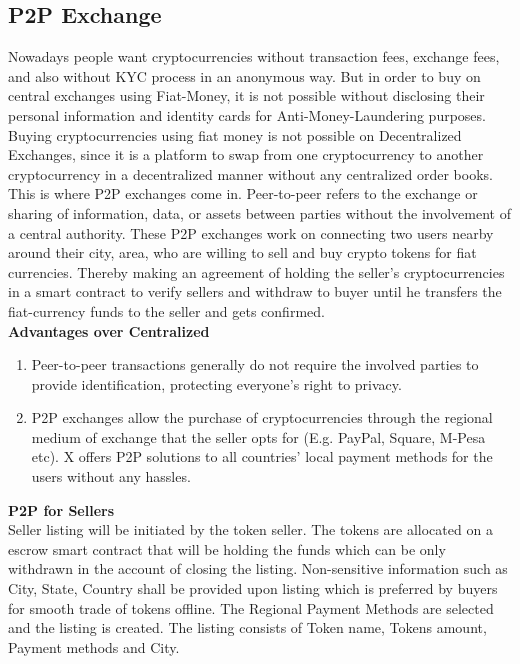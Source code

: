 \documentclass[letterpaper,11pt]{article}
\begin{document}
\subsection{P2P Exchange}

Nowadays people want cryptocurrencies without transaction fees, exchange fees, and also without KYC process in an anonymous way. But in order to buy on central exchanges using Fiat-Money, it is not possible without disclosing their personal information and identity cards for Anti-Money-Laundering purposes. Buying cryptocurrencies using fiat money is not possible on Decentralized Exchanges, since it is a platform to swap from one cryptocurrency to another cryptocurrency in a decentralized manner without any centralized order books.\\

This is where P2P exchanges come in. Peer-to-peer refers to the exchange or sharing of information, data, or assets between parties without the involvement of a central authority. These P2P exchanges work on connecting two users nearby around their city, area, who are willing to sell and buy crypto tokens for fiat currencies. Thereby making an agreement of holding the seller's cryptocurrencies in a smart contract to verify sellers and withdraw to buyer until he transfers the fiat-currency funds to the seller and gets confirmed.\\

\textbf{Advantages over Centralized}

\begin{enumerate}[wide, labelwidth=!, labelindent=0pt]
\item Peer-to-peer transactions generally do not require the involved parties to provide identification,  protecting everyone's right to privacy. 
\item P2P exchanges allow the purchase of cryptocurrencies through the regional medium of exchange that the seller opts for (E.g. PayPal, Square, M-Pesa  etc). X offers P2P solutions to all countries' local payment methods for the users without any hassles.
\end{enumerate}

\textbf{P2P for Sellers}\\

Seller listing will be initiated by the token seller. The tokens are allocated on a escrow smart contract that will be holding the funds which can be only withdrawn in the account of closing the listing. Non-sensitive information such as City, State, Country shall be provided upon listing which is preferred by buyers for smooth trade of tokens offline. The Regional Payment Methods are selected and the listing is created. The listing consists of Token name, Tokens amount, Payment methods and City.\\
\end{document}
